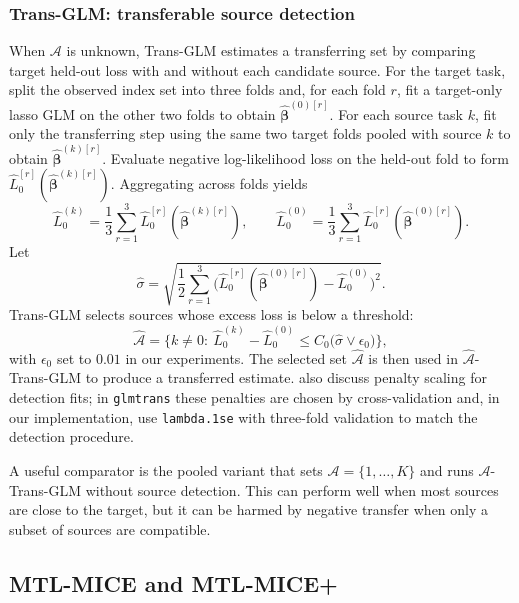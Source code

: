 \documentclass[12pt]{article}
\begin{document}
\subsubsection{Trans-GLM: transferable source detection}
\label{subsubsec:transglm}
When $\mathcal{A}$ is unknown, Trans-GLM estimates a transferring set by comparing target held-out loss with and without each candidate source.
For the target task, split the observed index set into three folds and, for each fold $r$, fit a target-only lasso GLM on the other two folds
to obtain $\hat{\bm{\beta}}^{(0)[r]}$. For each source task $k$, fit only the transferring step using the same two target folds pooled with
source $k$ to obtain $\hat{\bm{\beta}}^{(k)[r]}$. Evaluate negative log-likelihood loss on the held-out fold to form $\widehat{L}_0^{[r]}(\hat{\bm{\beta}}^{(k)[r]})$.
Aggregating across folds yields
\[
\widehat{L}^{(k)}_0=\frac{1}{3}\sum_{r=1}^3 \widehat{L}^{[r]}_0(\hat{\bm{\beta}}^{(k)[r]}),\qquad
\widehat{L}^{(0)}_0=\frac{1}{3}\sum_{r=1}^3 \widehat{L}^{[r]}_0(\hat{\bm{\beta}}^{(0)[r]}).
\]
Let
\[
\hat{\sigma}=\sqrt{\frac{1}{2}\sum_{r=1}^3\Big(\widehat{L}^{[r]}_0(\hat{\bm{\beta}}^{(0)[r]})-\widehat{L}^{(0)}_0\Big)^2 }.
\]
Trans-GLM selects sources whose excess loss is below a threshold:
\[
\widehat{\mathcal{A}}=\Big\{k\neq 0:\ \widehat{L}^{(k)}_0-\widehat{L}^{(0)}_0 \le C_0\big(\hat{\sigma}\vee \epsilon_0\big)\Big\},
\]
with $\epsilon_0$ set to $0.01$ in our experiments. The selected set $\widehat{\mathcal{A}}$ is then used in $\widehat{\mathcal{A}}$-Trans-GLM
to produce a transferred estimate. \citet{tian_transfer_2022} also discuss penalty scaling for detection fits; in \texttt{glmtrans} these penalties
are chosen by cross-validation and, in our implementation, use \texttt{lambda.1se} with three-fold validation to match the detection procedure. 

A useful comparator is the pooled variant that sets $\mathcal{A}=\{1,\dots,K\}$ and runs $\mathcal{A}$-Trans-GLM without source detection.
This can perform well when most sources are close to the target, but it can be harmed by negative transfer when only a subset of sources are compatible.

\subsection{MTL-MICE and MTL-MICE+}
\label{subsec:mtlmice_implementation}
\end{document}

